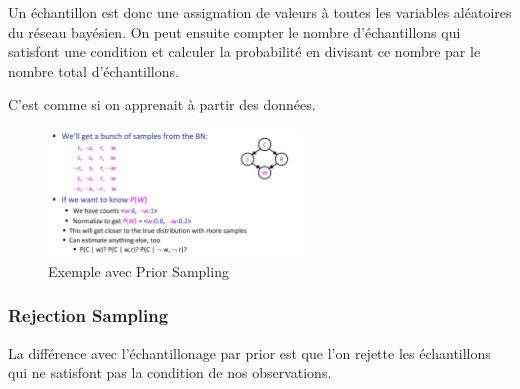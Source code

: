 Un échantillon est donc une assignation de valeurs à toutes les variables aléatoires du réseau bayésien.
On peut ensuite compter le nombre d'échantillons qui satisfont une condition et calculer la probabilité en divisant ce nombre par le nombre total d'échantillons.


\begin{remark}\leavevmode
    C'est comme si on apprenait à partir des données.
\end{remark}

\begin{figure}[H]
    \begin{center}
        \includegraphics[width=0.6\textwidth]{pictures/priors.png}
    \end{center}
    \caption{Exemple avec Prior Sampling}\label{fig:priors}
\end{figure}



\subsubsection{Rejection Sampling} %
\label{sec:rejection_sampling} 

La différence avec l'échantillonage par prior est que l'on rejette les échantillons qui ne satisfont pas la condition de nos observations.

